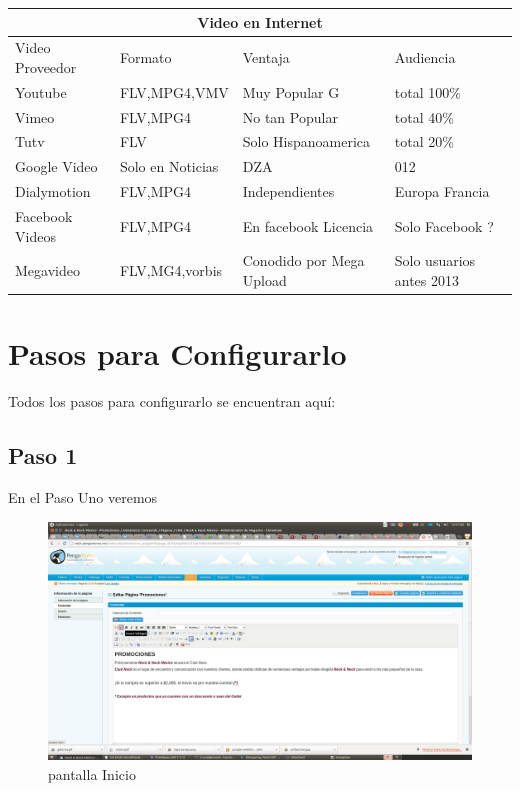 \documentclass[12pt, letterpaper]{article}
\begin{document}
\begin{center}
\begin{tabular}{ |p{3cm}||p{3cm}|p{3cm}|p{3cm}|  }
 \hline
 \multicolumn{4}{|c|}{Video en Internet} \\
 \hline
 Video Proveedor & Formato & Ventaja & Audiencia\\
 \hline
  Youtube   & FLV,MPG4,VMV & Muy Popular G&  total 100\% \\
  Vimeo&   FLV,MPG4   & No tan Popular   &  total 40\%  \\
  Tutv & FLV & Solo Hispanoamerica &  total 20\% \\
  Google Video  &Solo en Noticias & DZA&  012\\
 Dialymotion& FLV,MPG4  & Independientes & Europa Francia\\
 Facebook Videos& FLV,MPG4 & En facebook Licencia & Solo Facebook ?\\
 Megavideo& FLV,MG4,vorbis & Conodido por Mega Upload& Solo usuarios antes 2013\\
 \hline
\end{tabular}
\end{center}
 
\section{Pasos para Configurarlo}
 
Todos los pasos para configurarlo se encuentran aquí:

\subsection{Paso 1}

En el Paso Uno veremos

\begin{figure}[htp]
\centering
\includegraphics[width=16cm]{widget00}
\caption{pantalla Inicio}
\label{fig:simple}
\end{figure}
\end{document}
